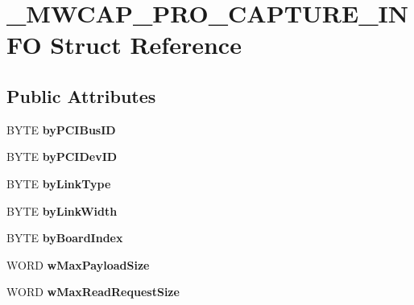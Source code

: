 \hypertarget{struct__MWCAP__PRO__CAPTURE__INFO}{\section{\-\_\-\-M\-W\-C\-A\-P\-\_\-\-P\-R\-O\-\_\-\-C\-A\-P\-T\-U\-R\-E\-\_\-\-I\-N\-F\-O Struct Reference}
\label{struct__MWCAP__PRO__CAPTURE__INFO}
}
\subsection*{Public Attributes}
\begin{DoxyCompactItemize}
\item 
\hypertarget{struct__MWCAP__PRO__CAPTURE__INFO_a405b0f5f2aea7cfc2180a6402f723c97}{B\-Y\-T\-E {\bfseries by\-P\-C\-I\-Bus\-I\-D}}\label{struct__MWCAP__PRO__CAPTURE__INFO_a405b0f5f2aea7cfc2180a6402f723c97}

\item 
\hypertarget{struct__MWCAP__PRO__CAPTURE__INFO_aeeaaacb71832649e4a523188d15925b3}{B\-Y\-T\-E {\bfseries by\-P\-C\-I\-Dev\-I\-D}}\label{struct__MWCAP__PRO__CAPTURE__INFO_aeeaaacb71832649e4a523188d15925b3}

\item 
\hypertarget{struct__MWCAP__PRO__CAPTURE__INFO_adf5ca3029dfa594c30013be6522c2cda}{B\-Y\-T\-E {\bfseries by\-Link\-Type}}\label{struct__MWCAP__PRO__CAPTURE__INFO_adf5ca3029dfa594c30013be6522c2cda}

\item 
\hypertarget{struct__MWCAP__PRO__CAPTURE__INFO_a8b56583bf25eea4cf02adbcd7ca9bb38}{B\-Y\-T\-E {\bfseries by\-Link\-Width}}\label{struct__MWCAP__PRO__CAPTURE__INFO_a8b56583bf25eea4cf02adbcd7ca9bb38}

\item 
\hypertarget{struct__MWCAP__PRO__CAPTURE__INFO_a897c2ac0fd8a35e49944d9a679327c0f}{B\-Y\-T\-E {\bfseries by\-Board\-Index}}\label{struct__MWCAP__PRO__CAPTURE__INFO_a897c2ac0fd8a35e49944d9a679327c0f}

\item 
\hypertarget{struct__MWCAP__PRO__CAPTURE__INFO_a2eda63150793cd9c38666697b6226fe3}{W\-O\-R\-D {\bfseries w\-Max\-Payload\-Size}}\label{struct__MWCAP__PRO__CAPTURE__INFO_a2eda63150793cd9c38666697b6226fe3}

\item 
\hypertarget{struct__MWCAP__PRO__CAPTURE__INFO_a5d1ceb6eb8cde18ac2cd153496ff558d}{W\-O\-R\-D {\bfseries w\-Max\-Read\-Request\-Size}}\label{struct__MWCAP__PRO__CAPTURE__INFO_a5d1ceb6eb8cde18ac2cd153496ff558d}


\end{DoxyCompactItemize}
